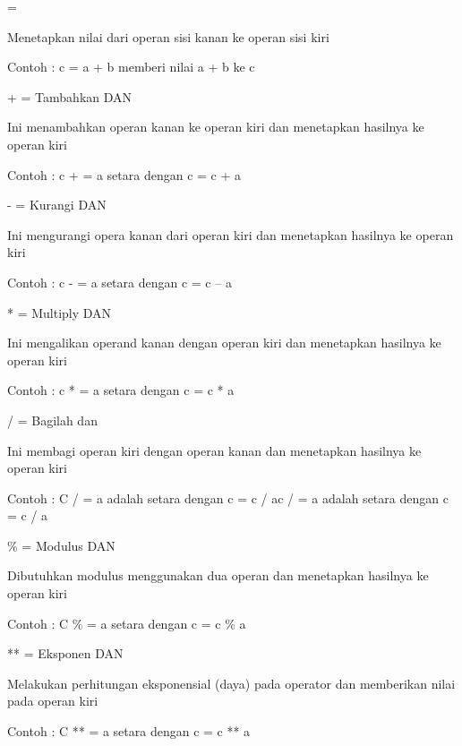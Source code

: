 \noindent
= \par
\noindent
Menetapkan nilai dari operan sisi kanan ke operan sisi kiri \hspace*{4.41in}  \par
\noindent
Contoh : c = a + b memberi nilai a + b ke c \par
\noindent
\vspace{12pt}
\noindent
+ = Tambahkan DAN \par
\noindent
Ini menambahkan operan kanan ke operan kiri dan menetapkan hasilnya ke operan kiri \par
\noindent
Contoh : c + = a setara dengan c = c + a \par
\noindent
\vspace{12pt}
\noindent
- = Kurangi DAN \par
\noindent
Ini mengurangi opera kanan dari operan kiri dan menetapkan hasilnya ke operan kiri \par
\noindent
Contoh : c - = a setara dengan c = c – a \par
\noindent
\vspace{12pt}
\noindent
* = Multiply DAN \par
\noindent
Ini mengalikan operand kanan dengan operan kiri dan menetapkan hasilnya ke operan kiri \par
\noindent
Contoh : c * = a setara dengan c = c * a \par
\noindent
\vspace{12pt}
\noindent
/ = Bagilah dan \par
\noindent
Ini membagi operan kiri dengan operan kanan dan menetapkan hasilnya ke operan kiri \par
\noindent
Contoh : C / = a adalah setara dengan c = c / ac / = a adalah setara dengan c = c / a \par
\noindent
\vspace{12pt}
\noindent
 $  \%  $ = Modulus DAN \par
\noindent
Dibutuhkan modulus menggunakan dua operan dan menetapkan hasilnya ke operan kiri \par
\noindent
Contoh : C $  \%  $ = a setara dengan c = c $  \%  $ a \par
\noindent
\vspace{12pt}
\noindent
** = Eksponen DAN \par
\noindent
Melakukan perhitungan eksponensial (daya) pada operator dan memberikan nilai pada operan kiri \par
\noindent
Contoh : C ** = a setara dengan c = c ** a \par
